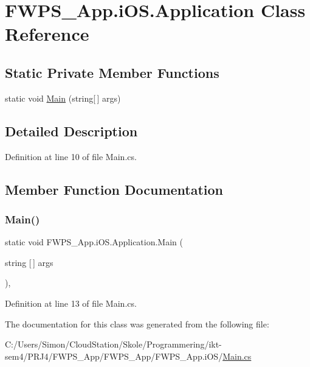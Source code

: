 \hypertarget{class_f_w_p_s___app_1_1i_o_s_1_1_application}{}\section{F\+W\+P\+S\+\_\+\+App.\+i\+O\+S.\+Application Class Reference}
\label{class_f_w_p_s___app_1_1i_o_s_1_1_application}
\subsection*{Static Private Member Functions}
\begin{DoxyCompactItemize}
\item 
static void \mbox{\hyperlink{class_f_w_p_s___app_1_1i_o_s_1_1_application_a309e495b99768ddb1789e726eab17ee8}{Main}} (string\mbox{[}$\,$\mbox{]} args)
\end{DoxyCompactItemize}


\subsection{Detailed Description}


Definition at line 10 of file Main.\+cs.



\subsection{Member Function Documentation}
\mbox{\label{class_f_w_p_s___app_1_1i_o_s_1_1_application_a309e495b99768ddb1789e726eab17ee8}} 
\subsubsection{\texorpdfstring{Main()}{Main()}}
{\footnotesize\ttfamily static void F\+W\+P\+S\+\_\+\+App.\+i\+O\+S.\+Application.\+Main (\begin{DoxyParamCaption}\item[{string \mbox{[}$\,$\mbox{]}}]{args }\end{DoxyParamCaption})\hspace{0.3cm}{\ttfamily [static]}, {\ttfamily [private]}}



Definition at line 13 of file Main.\+cs.



The documentation for this class was generated from the following file\+:\begin{DoxyCompactItemize}
\item 
C\+:/\+Users/\+Simon/\+Cloud\+Station/\+Skole/\+Programmering/ikt-\/sem4/\+P\+R\+J4/\+F\+W\+P\+S\+\_\+\+App/\+F\+W\+P\+S\+\_\+\+App/\+F\+W\+P\+S\+\_\+\+App.\+i\+O\+S/\mbox{\hyperlink{_main_8cs}{Main.\+cs}}\end{DoxyCompactItemize}
